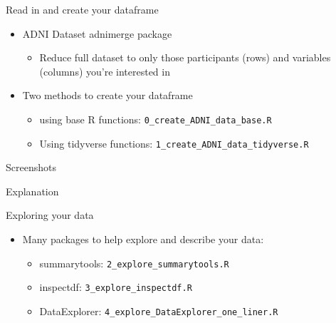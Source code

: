 \documentclass[
  ignorenonframetext,
]{beamer}
\providecommand{\tightlist}{%
  \setlength{\itemsep}{0pt}\setlength{\parskip}{0pt}}
\begin{document}
\begin{frame}[fragile]{Read in and create your dataframe}
\protect\hypertarget{read-in-and-create-your-dataframe}{}

\begin{itemize}
\tightlist
\item
  ADNI Dataset adnimerge package

  \begin{itemize}
  \tightlist
  \item
    Reduce full dataset to only those participants (rows) and variables
    (columns) you're interested in
  \end{itemize}
\item
  Two methods to create your dataframe

  \begin{itemize}
  \tightlist
  \item
    using base R functions: \texttt{0\_create\_ADNI\_data\_base.R}
  \item
    Using tidyverse functions:
    \texttt{1\_create\_ADNI\_data\_tidyverse.R}
  \end{itemize}
\end{itemize}

\end{frame}

\begin{frame}{Screenshots}
\protect\hypertarget{screenshots}{}

Explanation

\end{frame}

\begin{frame}[fragile]{Exploring your data}
\protect\hypertarget{exploring-your-data}{}

\begin{itemize}
\tightlist
\item
  Many packages to help explore and describe your data:

  \begin{itemize}
  \tightlist
  \item
    summarytools: \texttt{2\_explore\_summarytools.R}
  \item
    inspectdf: \texttt{3\_explore\_inspectdf.R}
  \item
    DataExplorer: \texttt{4\_explore\_DataExplorer\_one\_liner.R}
  \end{itemize}
\end{itemize}

\end{frame}
\end{document}
